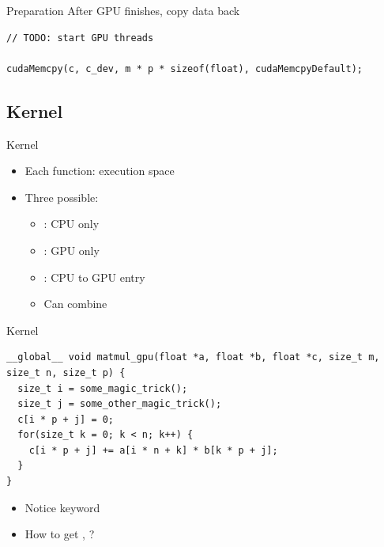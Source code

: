 \begin{frame}[fragile]{Preparation}
    \center
    After GPU finishes, copy data back
    \begin{verbatim}
// TODO: start GPU threads

cudaMemcpy(c, c_dev, m * p * sizeof(float), cudaMemcpyDefault);
    \end{verbatim}
\end{frame}

\subsection{Kernel}\label{subsec:kernel}
\begin{frame}[fragile]{Kernel}
    \center
    \begin{itemize}
        \item<1-> Each function: execution space
        \item<2-> Three possible:
        \begin{itemize}
            \item<2-> : CPU only
            \item<2-> : GPU only
            \item<2-> : CPU to GPU entry
            \item<3-> Can combine 
        \end{itemize}
    \end{itemize}
\end{frame}

\begin{frame}[fragile]{Kernel}
    \center
    \begin{verbatim}
__global__ void matmul_gpu(float *a, float *b, float *c, size_t m, size_t n, size_t p) {
  size_t i = some_magic_trick();
  size_t j = some_other_magic_trick();
  c[i * p + j] = 0;
  for(size_t k = 0; k < n; k++) {
    c[i * p + j] += a[i * n + k] * b[k * p + j];
  }
}
    \end{verbatim}
    \begin{itemize}
        \item<2-> Notice keyword 
        \item<3-> How to get , ?
    \end{itemize}
\end{frame}

